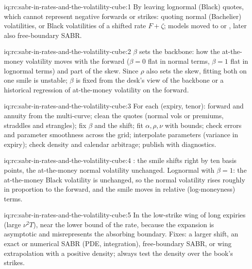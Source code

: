 \begin{solution}{iq:rc:sabr-in-rates-and-the-volatility-cube:1}
By leaving lognormal (Black) quotes, which cannot represent negative forwards
or strikes: quoting normal (Bachelier) volatilities, or Black volatilities of a
shifted rate $F+\zeta$; models moved to  or , later also
free-boundary SABR.
\end{solution}

\begin{solution}{iq:rc:sabr-in-rates-and-the-volatility-cube:2}
$\beta$ sets the backbone: how the at-the-money volatility moves with the
forward ($\beta=0$ flat in normal terms, $\beta=1$ flat in lognormal terms) and
part of the skew. Since $\rho$ also sets the skew, fitting both on one smile is
unstable; $\beta$ is fixed from the desk's view of the backbone or a historical
regression of at-the-money volatility on the forward.
\end{solution}

\begin{solution}{iq:rc:sabr-in-rates-and-the-volatility-cube:3}
For each (expiry, tenor): forward and annuity from the multi-curve; clean the
quotes (normal vols or premiums, straddles and strangles); fix $\beta$ and the
shift; fit $\alpha,\rho,\nu$ with bounds; check errors and parameter smoothness
across the grid; interpolate parameters (variance in expiry); check density and
calendar arbitrage; publish with diagnostics.
\end{solution}

\begin{solution}{iq:rc:sabr-in-rates-and-the-volatility-cube:4}
: the smile shifts right by ten basis points, the at-the-money normal
volatility unchanged. Lognormal with $\beta=1$: the at-the-money Black volatility
is unchanged, so the normal volatility rises roughly in proportion to the
forward, and the smile moves in relative (log-moneyness) terms.
\end{solution}

\begin{solution}{iq:rc:sabr-in-rates-and-the-volatility-cube:5}
In the low-strike wing of long expiries (large $\nu^2T$), near the lower bound
of the rate, because the expansion is asymptotic and misrepresents the
absorbing boundary. Fixes: a larger shift, an exact or numerical SABR (PDE,
integration), free-boundary SABR, or wing extrapolation with a positive
density; always test the density over the book's strikes.
\end{solution}


